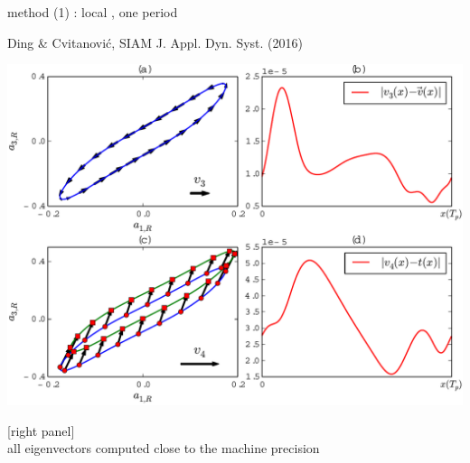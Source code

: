 \begin{frame}{method (1) : local \rpo, one period}
\begin{block}{Ding \& Cvitanovi{\'c}, SIAM J. Appl. Dyn. Syst. (2016)}
\begin{center}
\includegraphics[width=1.0\textwidth]{../../xiong/figures/ppo1vectfield}
\end{center}
\end{block}
[right panel] \\
all eigenvectors computed close to the machine precision
\end{frame}

